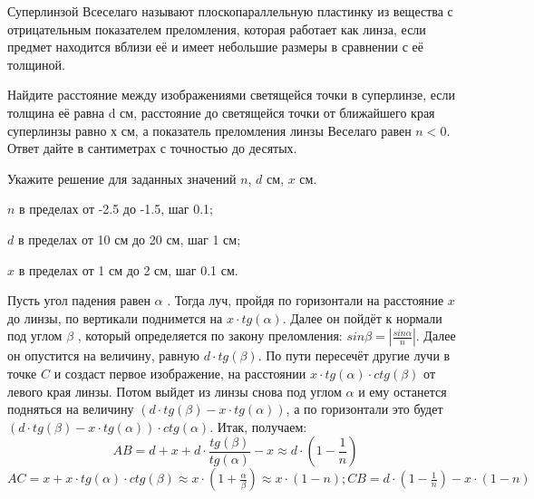
Суперлинзой Всеселаго называют плоскопараллельную
пластинку из вещества с отрицательным показателем преломления, которая работает
как линза, если предмет находится вблизи её и имеет небольшие размеры в
сравнении с её толщиной.

Найдите расстояние между изображениями светящейся
точки в суперлинзе, если толщина её равна d см, расстояние до светящейся точки  от ближайшего края суперлинзы равно х см, а показатель преломления линзы Веселаго равен $n < 0$. Ответ дайте в сантиметрах с точностью до десятых.

Укажите решение для заданных значений $n$, $d$ см, $x$ см.

\paramSection

$n$ в пределах от -2.5 до -1.5, шаг 0.1;    

$d$ в пределах от 10 см до 20 см, шаг 1 см;  

$x$ в пределах от 1 см до 2 см, шаг 0.1 см.

\solutionSection

Пусть угол падения равен $\alpha$ . Тогда луч, пройдя по горизонтали на расстояние $x$ до линзы, 
по вертикали поднимется на $x \cdot tg(\alpha )$. Далее он пойдёт к нормали под углом  $\beta$ , который 
определяется по закону преломления: $sin\beta =\left|\frac{sin\alpha}{n}\right|$. Далее он опустится на 
величину, равную $d \cdot  tg( \beta )$. По пути пересечёт другие лучи в точке $C$ и создаст первое изображение,  
на расстоянии  $x \cdot tg(\alpha ) \cdot ctg( \beta )$  от левого края линзы. Потом выйдет из линзы снова под 
углом $\alpha$  и ему останется подняться на величину $(d \cdot  tg( \beta ) - x \cdot tg(\alpha ) )$, а по 
горизонтали это будет $(d \cdot  tg( \beta ) - x \cdot tg(\alpha )) \cdot ctg(\alpha )$. Итак, получаем:  
$$AB=d+x+d \cdot \frac{tg( \beta )}{tg(\alpha )}-x \approx d \cdot \left(1-\frac{1}{n}\right)$$
$AC=x+x \cdot tg(\alpha ) \cdot ctg( \beta ) \approx x \cdot \left(1+\frac{\alpha}{\beta} \right) \approx x 
\cdot (1-n);  CB=d \cdot \left(1-\frac{1}{n}\right)-x \cdot (1-n)$


